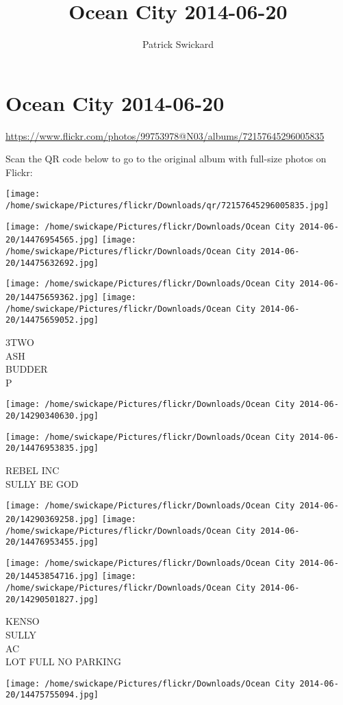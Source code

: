\documentclass[10pt,letterpaper]{article}
\title{Ocean City 2014-06-20}
\author{Patrick Swickard}
\date{}
\begin{document}
\section*{Ocean City 2014-06-20}

\url{https://www.flickr.com/photos/99753978@N03/albums/72157645296005835}

Scan the QR code below to go to the original album with full-size photos on Flickr:

\texttt{[image: /home/swickape/Pictures/flickr/Downloads/qr/72157645296005835.jpg]}
\pagebreak

\texttt{[image: /home/swickape/Pictures/flickr/Downloads/Ocean City 2014-06-20/14476954565.jpg]}
\texttt{[image: /home/swickape/Pictures/flickr/Downloads/Ocean City 2014-06-20/14475632692.jpg]}

\texttt{[image: /home/swickape/Pictures/flickr/Downloads/Ocean City 2014-06-20/14475659362.jpg]}
\texttt{[image: /home/swickape/Pictures/flickr/Downloads/Ocean City 2014-06-20/14475659052.jpg]}

3TWO\\
ASH\\
BUDDER\\
P
\pagebreak

\texttt{[image: /home/swickape/Pictures/flickr/Downloads/Ocean City 2014-06-20/14290340630.jpg]}

\vspace{0.25in}
\texttt{[image: /home/swickape/Pictures/flickr/Downloads/Ocean City 2014-06-20/14476953835.jpg]}

REBEL INC\\
SULLY BE GOD
\pagebreak

\texttt{[image: /home/swickape/Pictures/flickr/Downloads/Ocean City 2014-06-20/14290369258.jpg]}
\texttt{[image: /home/swickape/Pictures/flickr/Downloads/Ocean City 2014-06-20/14476953455.jpg]}

\texttt{[image: /home/swickape/Pictures/flickr/Downloads/Ocean City 2014-06-20/14453854716.jpg]}
\texttt{[image: /home/swickape/Pictures/flickr/Downloads/Ocean City 2014-06-20/14290501827.jpg]}

KENSO\\
SULLY\\
AC\\
LOT FULL NO PARKING
\pagebreak

\texttt{[image: /home/swickape/Pictures/flickr/Downloads/Ocean City 2014-06-20/14475755094.jpg]}
\end{document}
